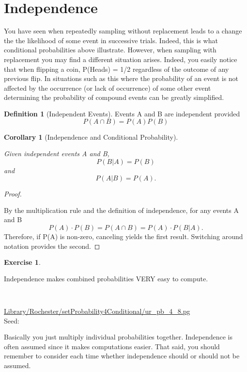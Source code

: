 \documentclass[10pt,]{book}
\theoremstyle{plain}
\newtheorem{corollary}[theorem]{Corollary}
\theoremstyle{definition}
\newtheorem{definition}[theorem]{Definition}
\theoremstyle{definition}
\theoremstyle{definition}
\newtheorem{exercise}[theorem]{Exercise}
\numberwithin{equation}{section}
\begin{document}
\section[{Independence}]{Independence}\label{section-24}
\typeout{************************************************}
\typeout{************************************************}
You have seen when repeatedly sampling without replacement leads to a change the the likelihood of some event in successive trials. Indeed, this is what conditional probabilities above illustrate. However, when sampling with replacement you may find a different situation arises. Indeed, you easily notice that when flipping a coin, P(Heads) = 1/2 regardless of the outcome of any previous flip.  In situations such as this where the probability of an event is not affected by the occurrence (or lack of occurrence) of some other event determining the probability of compound events can be greatly simplified.
\begin{definition}[{Independent Events}]\label{definition-23}
Events A and B are independent provided 
		\begin{equation*}P(A \cap B) = P(A) P(B)\end{equation*}\end{definition}
\begin{corollary}[{Independence and Conditional Probability}]\label{corollary-3}

			Given independent events A and B, 
			\begin{equation*}P(B | A) = P(B)\end{equation*} and \begin{equation*}P(A | B) = P(A).\end{equation*}\end{corollary}
\begin{proof}\hypertarget{proof-20}{}
By the multiplication rule and the definition of independence, for any events A and B
			\begin{equation*}P(A) \cdot P(B) = P(A \cap B) = P(A) \cdot P(B | A) .\end{equation*}
			Therefore, if P(A) is non-zero, canceling yields the first result. Switching around notation provides the second.
\end{proof}
\begin{exercise}\label{exercise-34}

		Independence makes combined probabilities VERY easy to compute.
\par\medskip
\mbox{}\\ %
\begin{mdframed}
{}\par\vspace*{2ex}%
{\tiny\ttfamily\noindent\url{Library/Rochester/setProbability4Conditional/ur_pb_4_8.pg}\\Seed: \hfill}\end{mdframed}
\medskip\noindent 
		Basically you just multiply individual probabilities together.  Independence is often
		assumed since it makes computations easier. That said, you should remember to consider
		each time whether independence should or should not be assumed.
\par
\end{exercise}
\end{document}

